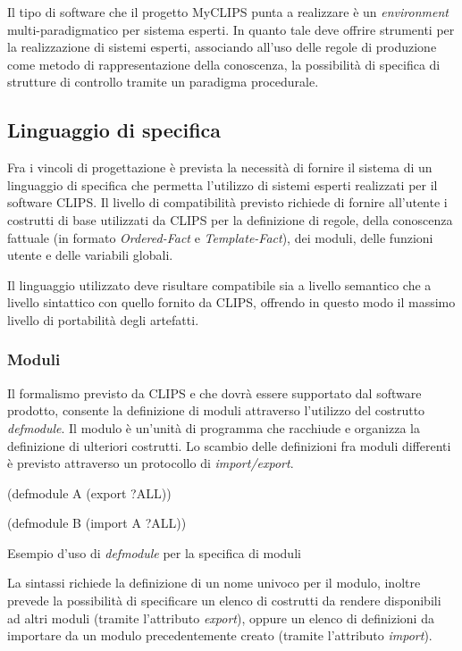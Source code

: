 Il tipo di software che il progetto MyCLIPS punta a realizzare è un \emph{environment} multi-paradigmatico per sistema esperti. In quanto tale deve offrire strumenti per la realizzazione di sistemi esperti, associando all'uso delle regole di produzione come metodo di rappresentazione della conoscenza, la possibilità di specifica di strutture di controllo tramite un paradigma procedurale.

\subsection{Linguaggio di specifica}\label{par:linguaggio}
Fra i vincoli di progettazione è prevista la necessità di fornire il sistema di un linguaggio di specifica che permetta l'utilizzo di sistemi esperti realizzati per il software CLIPS. Il livello di compatibilità previsto richiede di fornire all'utente i costrutti di base utilizzati da CLIPS per la definizione di regole, della conoscenza fattuale (in formato \emph{Ordered-Fact} e \emph{Template-Fact}), dei moduli, delle funzioni utente e delle variabili globali.

Il linguaggio utilizzato deve risultare compatibile sia a livello semantico che a livello sintattico con quello fornito da CLIPS, offrendo in questo modo il massimo livello di portabilità degli artefatti.

\subsubsection{Moduli}\label{par:linguaggio-moduli}
Il formalismo previsto da CLIPS e che dovrà essere supportato dal software prodotto, consente la definizione di moduli attraverso l'utilizzo del costrutto \emph{defmodule}.
Il modulo è un'unità di programma che racchiude e organizza la definizione di ulteriori costrutti. Lo scambio delle definizioni fra moduli differenti è previsto attraverso un protocollo di \emph{import/export}.

\begin{program}
\begin{verbatimtab}

(defmodule A
	(export ?ALL))

(defmodule B
	(import A ?ALL))
\end{verbatimtab}
\caption{Esempio d'uso di \emph{defmodule} per la specifica di moduli}
\end{program}

La sintassi richiede la definizione di un nome univoco per il modulo, inoltre prevede la possibilità di specificare un elenco di costrutti da rendere disponibili ad altri moduli (tramite l'attributo \emph{export}), oppure un elenco di definizioni da importare da un modulo precedentemente creato (tramite l'attributo \emph{import}).



